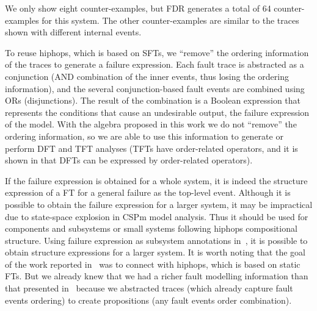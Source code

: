 \documentclass[12pt,openright,twoside,a4paper,oldfontcommands,english,brazil,final]{abntex2}
\theoremstyle{theo}
\begin{document}
We only show eight counter-examples, but \acs{FDR} generates a total of 64 counter-examples for this system.
The other counter-examples are similar to the traces shown with different internal events.

To reuse \ac{hiphops}, which is based on \acp{SFT}, we ``remove'' the ordering information of the traces to generate a failure expression.
Each fault trace is abstracted as a conjunction (\ac{AND} combination of the inner events, thus losing the ordering information), and the several conjunction-based fault events are combined using \acp{OR} (disjunctions).
The result of the combination is a Boolean expression that represents the conditions that cause an undesirable output, the failure expression of the model.
With the \ac{algebra} proposed in this work we do not ``remove'' the ordering information, so we are able to use this information to generate or perform \ac{DFT} and \ac{TFT} analyses (\acp{TFT} have order-related operators, and it is shown in \cite{Merle2010,MRL2011b,MRL2011} that \acp{DFT} can be expressed by order-related operators).

If the failure expression is obtained for a whole system, it is indeed the structure expression of a \acl{FT} for a general failure as the top-level event.
Although it is possible to obtain the failure expression for a larger system, it may be impractical due to state-space explosion in \ac{CSPm} model analysis.
Thus it should be used for components and subsystems or small systems following \ac{hiphops} compositional structure.
%
Using failure expression as subsystem annotations in~\cite{PMS+2001}, it is possible to obtain structure expressions for a larger system.
It is worth noting that the goal of the work reported in~\cite{DM2012} was to connect with \ac{hiphops}, which is based on static \aclp{FT}.
But we already knew that we had a richer fault modelling information than that presented in~\cite{DM2012} because we abstracted traces (which already capture fault events ordering) to create propositions (any fault events order combination).
\end{document}
